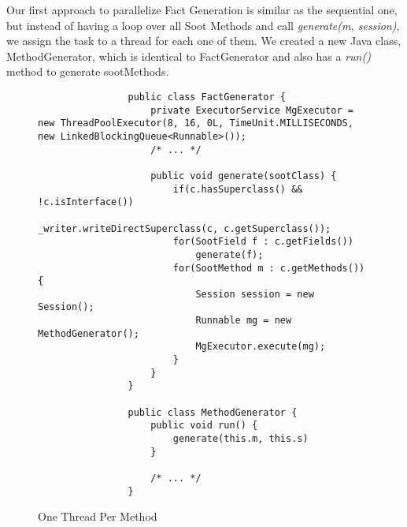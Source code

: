 \documentclass{dithesis}
\begin{document}
        Our first approach to parallelize Fact Generation is similar as the sequential one, but instead of having a loop over all Soot Methods and call \textit{generate(m, session)}, we assign the task to a thread for each one of them. We created a new Java class, MethodGenerator, which is identical to FactGenerator and also has a \textit{run()} method to generate sootMethods. 
        \begin{figure}[H]
            \begin{lstlisting}
                public class FactGenerator {
                    private ExecutorService MgExecutor = new ThreadPoolExecutor(8, 16, 0L, TimeUnit.MILLISECONDS, new LinkedBlockingQueue<Runnable>());
                    /* ... */

                    public void generate(sootClass) {
                        if(c.hasSuperclass() && !c.isInterface())
                            _writer.writeDirectSuperclass(c, c.getSuperclass());
                        for(SootField f : c.getFields())
                            generate(f);
                        for(SootMethod m : c.getMethods()) {
                            Session session = new Session();
                            Runnable mg = new MethodGenerator();
                            MgExecutor.execute(mg);
                        }
                    }
                }

                public class MethodGenerator {
                    public void run() {
                        generate(this.m, this.s)
                    }

                    /* ... */
                }
            \end{lstlisting}
        \caption{One Thread Per Method}
        \end{figure}
\end{document}
